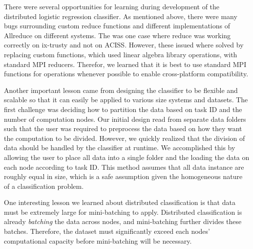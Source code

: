 There were several opportunities for learning during development of the distributed logistic regression classifier.  As mentioned above, there were many bugs surrounding custom reduce functions and different implementations of Allreduce on different systems.  The was one case where reduce was working correctly on ix-trusty and not on ACISS.  However, these issued where solved by replacing custom functions, which used linear algebra library operations, with standard MPI reducers.  Therefor, we learned that it is best to use standard MPI functions for operations whenever possible to enable cross-platform compatibility.

Another important lesson came from designing the classifier to be flexible and scalable so that it can easily be applied to various size systems and datasets.  The first challenge was deciding how to partition the data based on task ID and the number of computation nodes.  Our initial design read from separate data folders such that the user was required to preprocess the data based on how they want the computation to be divided.  However, we quickly realized that the division of data should be handled by the classifier at runtime.  We accomplished this by allowing the user to place all data into a single folder and the loading the data on each node according to task ID.  This method assumes that all data instance are roughly equal in size, which is a safe assumption given the homogeneous nature of a classification problem.

One interesting lesson we learned about distributed classification is that data must be extremely large for mini-batching to apply.  Distributed classification is already \emph{batching} the data across nodes, and mini-batching further divides these batches.  Therefore, the dataset must significantly exceed each nodes' computational capacity before mini-batching will be necessary.
